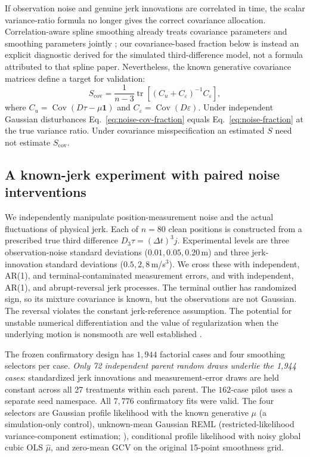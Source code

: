If observation noise and genuine jerk innovations are correlated
in time, the scalar variance-ratio formula no longer gives the
correct covariance allocation. Correlation-aware spline smoothing
already treats covariance parameters and smoothing parameters
jointly \citep{wang1998correlated}; our covariance-based
fraction below is instead an explicit diagnostic derived
for the simulated third-difference model, not a formula
attributed to that spline paper. Nevertheless, the known generative
covariance matrices define a target for validation:
\begin{equation}
\label{eq:noise-cov-fraction}
S_{\mathrm{cov}}
=\frac{1}{n-3}
\operatorname{tr}\!\left[
(C_u+C_\varepsilon)^{-1}C_\varepsilon
\right],
\end{equation}
where $C_u=\operatorname{Cov}(D\tau-\mu\mathbf 1)$ and
$C_\varepsilon=\operatorname{Cov}(D\varepsilon)$.
Under independent Gaussian disturbances Eq.~\eqref{eq:noise-cov-fraction}
equals Eq.~\eqref{eq:noise-fraction} at the true variance ratio.
Under covariance misspecification an estimated $S$ need not
estimate $S_{\mathrm{cov}}$.

\subsection{A known-jerk experiment with paired noise interventions}
We independently manipulate position-measurement noise and the
actual fluctuations of physical jerk. Each of $n=80$ clean
positions is constructed from a prescribed true third difference
$D_3\tau=(\Delta t)^3j$. Experimental levels are three
observation-noise standard deviations ($0.01,0.05,0.20$\,m)
and three jerk-innovation standard deviations
($0.5,2,8$\,m/s$^3$). We cross these with independent, AR(1),
and terminal-contaminated measurement errors, and with independent,
AR(1), and abrupt-reversal jerk processes. The terminal outlier
has randomized sign, so its mixture covariance is known, but
the observations are not Gaussian. The reversal violates the
constant jerk-reference assumption. The potential for unstable
numerical differentiation and the value of regularization when
the underlying motion is nonsmooth are well established
\citep{ahnert2007,chartrand2011}.

The frozen confirmatory design has $1{,}944$ factorial cases
and four smoothing selectors per case. \emph{Only 72 independent
parent random draws underlie the 1,944 cases}: standardized jerk
innovations and measurement-error draws are held constant across
all 27 treatments within each parent. The $162$-case pilot uses
a separate seed namespace. All $7{,}776$ confirmatory fits were
valid. The four selectors are Gaussian profile likelihood with
the known generative $\mu$ (a simulation-only control), unknown-mean
Gaussian REML (restricted-likelihood variance-component estimation;
\citealp{patterson1971,harville1977}), conditional profile likelihood with noisy global
cubic OLS $\widehat\mu$, and zero-mean GCV on the original 15-point
smoothness grid.

